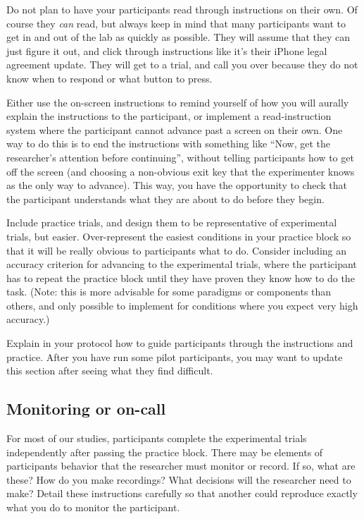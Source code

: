 \documentclass[12pt,]{book}
\theoremstyle{definition}
\theoremstyle{definition}
\theoremstyle{definition}
\theoremstyle{remark}
\begin{document}
Do not plan to have your participants read through instructions on their
own. Of course they \emph{can} read, but always keep in mind that many
participants want to get in and out of the lab as quickly as possible.
They will assume that they can just figure it out, and click through
instructions like it's their iPhone legal agreement update. They will
get to a trial, and call you over because they do not know when to
respond or what button to press.

Either use the on-screen instructions to remind yourself of how you will
aurally explain the instructions to the participant, or implement a
read-instruction system where the participant cannot advance past a
screen on their own. One way to do this is to end the instructions with
something like ``Now, get the researcher's attention before
continuing'', without telling participants how to get off the screen
(and choosing a non-obvious exit key that the experimenter knows as the
only way to advance). This way, you have the opportunity to check that
the participant understands what they are about to do before they begin.

Include practice trials, and design them to be representative of
experimental trials, but easier. Over-represent the easiest conditions
in your practice block so that it will be really obvious to participants
what to do. Consider including an accuracy criterion for advancing to
the experimental trials, where the participant has to repeat the
practice block until they have proven they know how to do the task.
(Note: this is more advisable for some paradigms or components than
others, and only possible to implement for conditions where you expect
very high accuracy.)

Explain in your protocol how to guide participants through the
instructions and practice. After you have run some pilot participants,
you may want to update this section after seeing what they find
difficult.

\subsection{Monitoring or on-call}\label{monitoring-or-on-call}

For most of our studies, participants complete the experimental trials
independently after passing the practice block. There may be elements of
participants behavior that the researcher must monitor or record. If so,
what are these? How do you make recordings? What decisions will the
researcher need to make? Detail these instructions carefully so that
another could reproduce exactly what you do to monitor the participant.
\end{document}

